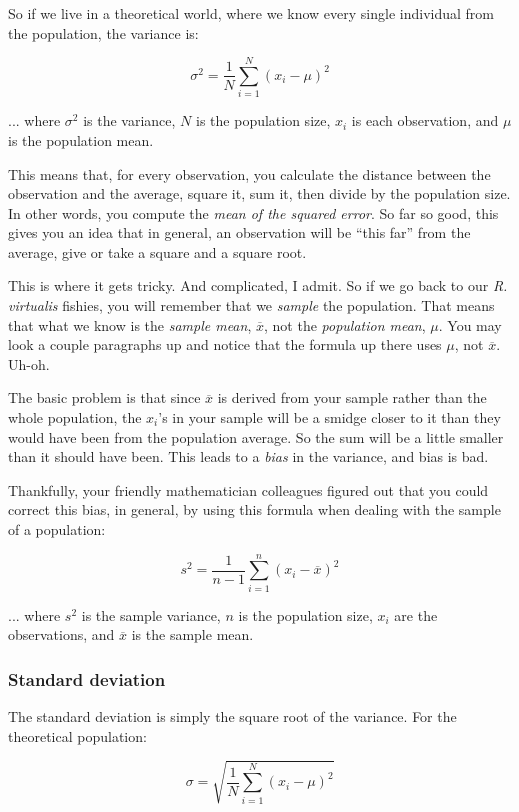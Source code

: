\documentclass{report}
\newcommand{\species}[1]{\textit{#1}}
\begin{document}
		So if we live in a theoretical world, where we know every single individual from the population, the variance is:
		
		\[
			\sigma^2 = \frac{1}{N}\sum_{i=1}^{N} (x_i - \mu)^2
		\]
		
		... where $\sigma^2$ is the variance, $N$ is the population size, $x_i$ is each observation, and $\mu$ is the population mean.
		
		This means that, for every observation, you calculate the distance between the observation and the average, square it, sum it, then divide by the population size. In other words, you compute the \emph{mean of the squared error}. So far so good, this gives you an idea that in general, an observation will be ``this far'' from the average, give or take a square and a square root.
		
		This is where it gets tricky. And complicated, I admit. So if we go back to our \species{R. virtualis} fishies, you will remember that we \emph{sample} the population. That means that what we know is the \emph{sample mean}, $\overline{x}$, not the \emph{population mean}, $\mu$. You may look a couple paragraphs up and notice that the formula up there uses $\mu$, not $\overline{x}$. Uh-oh.
		
		The basic problem is that since $\overline{x}$ is derived from your sample rather than the whole population, the $x_i$'s in your sample will be a smidge closer to it than they would have been from the population average. So the sum will be a little smaller than it should have been. This leads to a \emph{bias} in the variance, and bias is bad.
		
		Thankfully, your friendly mathematician colleagues figured out that you could correct this bias, in general, by using this formula when dealing with the sample of a population:
		
		\[
		s^2 = \frac{1}{n-1}\sum_{i=1}^{n} (x_i - \overline{x})^2
		\]
		
		... where $s^2$ is the sample variance, $n$ is the population size, $x_i$ are the observations, and $\overline{x}$ is the sample mean.
		
			\subsubsection{Standard deviation}
			
			The standard deviation is simply the square root of the variance. For the theoretical population:
			
			\[
			\sigma = \sqrt{\frac{1}{N}\sum_{i=1}^{N} (x_i - \mu)^2}
			\]
			
\end{document}

